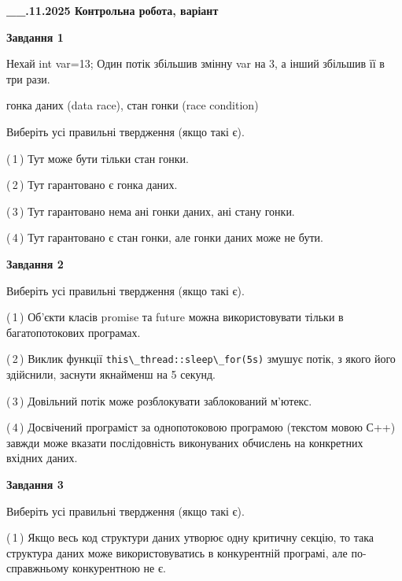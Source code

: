 \documentclass[12pt, ukrainian]{article}
\def\code#1{\Verb!#1!}
\begin{document}
\begin {large}

\textbf{\_\_.11.2025 Контрольна робота, варіант  }\par


{

\begin{center}
\textbf{Завдання 1}
\end{center}
Нехай int var=13; Один потік збільшив змінну var на 3, а інший збільшив її в три рази.

гонка даних (data race), стан гонки (race condition)

Виберіть усі правильні твердження (якщо такі є).\par
\vspace{2mm}
(\,1\,) Тут може бути тільки стан гонки.%

(\,2\,) Тут гарантовано є гонка даних.%

(\,3\,) Тут гарантовано нема ані гонки даних, ані стану гонки.%

(\,4\,) Тут гарантовано є стан гонки, але гонки даних може не бути.%



\begin{center}
\textbf{Завдання 2}
\end{center}
Виберіть усі правильні твердження (якщо такі є).\par
\vspace{2mm}

(\,1\,) Об’єкти класів promise та future можна використовувати тільки в багатопотокових програмах.%

(\,2\,) Виклик функції \code{this\_thread::sleep\_for(5s)} змушує потік, з якого його здійснили, заснути якнайменш на 5 секунд.%

(\,3\,) Довільний потік може розблокувати заблокований м’ютекс.%

(\,4\,) Досвічений програміст за однопотоковою програмою (текстом мовою С++) завжди може вказати послідовність виконуваних обчислень на конкретних вхідних даних.%



\begin{center}
\textbf{Завдання 3}
\end{center}
Виберіть усі правильні твердження (якщо такі є).\par
\vspace{2mm}

(\,1\,) Якщо весь код структури даних утворює одну критичну секцію, то така структура даних може використовуватись в конкурентній програмі, але по-справжньо\-му конкурентною не є.%

}
\end{large}
\end{document}
